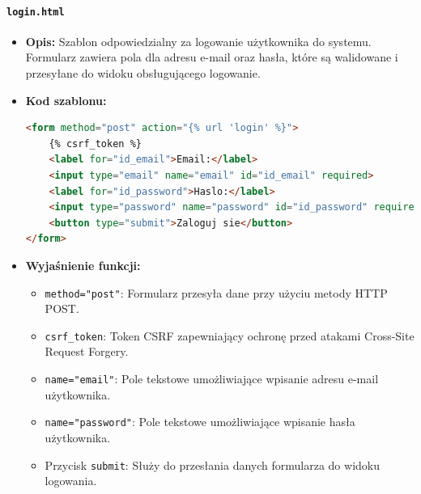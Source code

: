 \documentclass[12pt,a4paper,oneside]{article}
\theoremstyle{definition}
\numberwithin{equation}{section}
\begin{document}
\paragraph{\texttt{login.html}}
\begin{itemize}
    \item \textbf{Opis:} Szablon odpowiedzialny za logowanie użytkownika do systemu. Formularz zawiera pola dla adresu e-mail oraz hasła, które są walidowane i przesyłane do widoku obsługującego logowanie.
    \item \textbf{Kod szablonu:}
    \begin{lstlisting}[language=HTML, caption=Szablon \texttt{login.html}]
<form method="post" action="{% url 'login' %}">
    {% csrf_token %}
    <label for="id_email">Email:</label>
    <input type="email" name="email" id="id_email" required>
    <label for="id_password">Haslo:</label>
    <input type="password" name="password" id="id_password" required>
    <button type="submit">Zaloguj sie</button>
</form>
    \end{lstlisting}
    \item \textbf{Wyjaśnienie funkcji:}
    \begin{itemize}
        \item \texttt{method="post"}: Formularz przesyła dane przy użyciu metody HTTP POST.
        \item \texttt{csrf\_token}: Token CSRF zapewniający ochronę przed atakami Cross-Site Request Forgery.
        \item \texttt{name="email"}: Pole tekstowe umożliwiające wpisanie adresu e-mail użytkownika.
        \item \texttt{name="password"}: Pole tekstowe umożliwiające wpisanie hasła użytkownika.
        \item Przycisk \texttt{submit}: Służy do przesłania danych formularza do widoku logowania.
    \end{itemize}
\end{itemize}


\label{sec:register_template}
\end{document}
